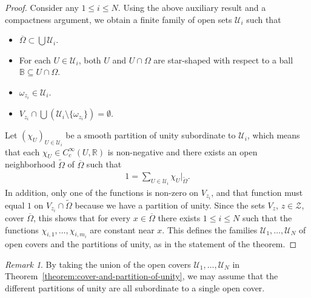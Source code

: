 \documentclass[10pt,a4paper]{amsart}
\theoremstyle{definition}
\theoremstyle{remark}
\newtheorem{remark}[theorem]{Remark}
\numberwithin{equation}{section}
\newcommand{\bbB}{{\mathbb B}}
\newcommand{\bbR}{{\mathbb R}}
\newcommand{\calU}{{\mathcal U}}
\newcommand{\calZ}{{\mathcal Z}}
\newcommand{\closure}{\overline}
\renewcommand{\restriction}{|}
\newcommand{\smallball}{\bbB}
\newcommand{\tsum}{{\textstyle{\sum}}}
\newcommand{\Domain}{{\Omega}}
\newcommand{\subdomain}{{\omega}}
\newcommand{\Cover}{\calU}
\begin{document}
\begin{proof}
    Consider any $1 \leq i \leq N$. 
    Using the above auxiliary result and a compactness argument, 
    we obtain a finite family of open sets $\Cover_{i}$ such that
    \begin{itemize}
        \item $\closure{\Domain} \subset \bigcup\Cover_{i}$.
        \item For each $U \in \Cover_{i}$, both $U$ and $U \cap \Domain$ are star-shaped with respect to a ball $\smallball \subseteq U \cap \Domain$.
        \item $\subdomain_{z_{i}} \in \Cover_{i}$.
        \item $V_{z_{i}} \cap \bigcup \left( \Cover_{i} \setminus \{\subdomain_{z_i}\} \right) = \emptyset$.
    \end{itemize}
    Let $\left( \chi_{U} \right)_{U \in \Cover_{i}}$ be a smooth partition of unity subordinate to $\Cover_{i}$, 
    which means that each $\chi_{U} \in C^{\infty}_{c}(U,\bbR)$ is non-negative
and there exists an open neighborhood $\widetilde{\Domain}$ of $\closure\Domain$ such that 
    \begin{align*}
        1 = \tsum_{U \in \Cover_{i}} \chi_{U} \restriction_{\widetilde{\Domain}}.
    \end{align*}
    In addition, only one of the functions is non-zero on $V_{z_{i}}$, and that function must equal $1$ on $V_{z_{i}} \cap \widetilde{\Domain}$ because we have a partition of unity.
    Since the sets $V_{z}$, $z \in \calZ$, cover $\closure{\Domain}$, this shows that for every $x \in \closure{\Domain}$ there exists $1 \leq i \leq N$ such that the functions $\chi_{i,1}, \dots, \chi_{i,m_{i}}$ are constant near $x$.
    This defines the families $\Cover_{1}, \dots, \Cover_{N}$ of open covers and the partitions of unity, 
    as in the statement of the theorem.
\end{proof}

\begin{remark}
    By taking the union of the open covers $\Cover_{1}, \dots, \Cover_{N}$ in Theorem~\ref{theorem:cover-and-partition-of-unity},
    we may assume that the different partitions of unity are all subordinate to a single open cover. 
\end{remark}
\end{document}
